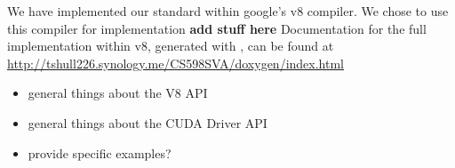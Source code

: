 

We have implemented our \name standard within google's v8 \cite{v8} compiler. We
chose to use this compiler for implementation {\bf add stuff here}
Documentation for the full \name implementation within v8, generated with
\cite{doxygen}, can be found at 
\url{http://tshull226.synology.me/CS598SVA/doxygen/index.html}

\begin{itemize}

\item general things about the V8 API
\item general things about the CUDA Driver API
\item provide specific examples?

\end{itemize}




